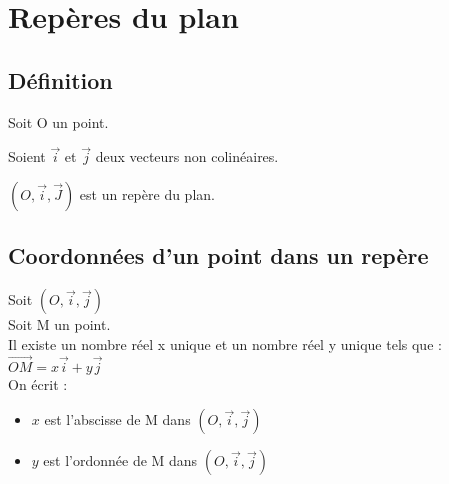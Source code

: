 \section{Repères du plan}

\subsection{Définition}

Soit O un point.

Soient $\vec{i}$ et $\vec{j}$ deux vecteurs non colinéaires.


$\left(O, \vec{i}, \vec{J}\right)$ est un repère du plan.

\subsection{Coordonnées d'un point dans un repère}

Soit $\left(O, \vec{i}, \vec{j}\right)$\\

Soit M un point. \\

Il existe un nombre réel x unique et un nombre réel y unique tels que : \\

$ \overrightarrow{OM} = x\vec{i} + y\vec{j} $ \\

On écrit :

\begin{itemize}
\item $x$ est l'abscisse de M dans $\left(O, \vec{i}, \vec{j}\right)$\\
\item $y$ est l'ordonnée de M dans $\left(O,\vec{i}, \vec{j}\right)$\\
\end{itemize}


